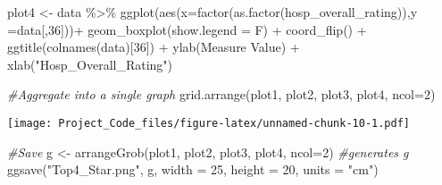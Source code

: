\documentclass[
]{article}
\newenvironment{Shaded}{\begin{snugshade}}{\end{snugshade}}
\newcommand{\AttributeTok}[1]{\textcolor[rgb]{0.77,0.63,0.00}{#1}}
\newcommand{\CommentTok}[1]{\textcolor[rgb]{0.56,0.35,0.01}{\textit{#1}}}
\newcommand{\DecValTok}[1]{\textcolor[rgb]{0.00,0.00,0.81}{#1}}
\newcommand{\FunctionTok}[1]{\textcolor[rgb]{0.00,0.00,0.00}{#1}}
\newcommand{\NormalTok}[1]{#1}
\newcommand{\OtherTok}[1]{\textcolor[rgb]{0.56,0.35,0.01}{#1}}
\newcommand{\SpecialCharTok}[1]{\textcolor[rgb]{0.00,0.00,0.00}{#1}}
\newcommand{\StringTok}[1]{\textcolor[rgb]{0.31,0.60,0.02}{#1}}
\begin{document}
\begin{Shaded}
\begin{Highlighting}[]
\NormalTok{plot4 }\OtherTok{\textless{}{-}}\NormalTok{ data }\SpecialCharTok{\%\textgreater{}\%} \FunctionTok{ggplot}\NormalTok{(}\FunctionTok{aes}\NormalTok{(}\AttributeTok{x=}\FunctionTok{factor}\NormalTok{(}\FunctionTok{as.factor}\NormalTok{(hosp\_overall\_rating)),}\AttributeTok{y =}\NormalTok{data[,}\DecValTok{36}\NormalTok{]))}\SpecialCharTok{+}
  \FunctionTok{geom\_boxplot}\NormalTok{(}\AttributeTok{show.legend =}\NormalTok{ F) }\SpecialCharTok{+}
  \FunctionTok{coord\_flip}\NormalTok{() }\SpecialCharTok{+}
  \FunctionTok{ggtitle}\NormalTok{(}\FunctionTok{colnames}\NormalTok{(data)[}\DecValTok{36}\NormalTok{]) }\SpecialCharTok{+} 
  \FunctionTok{ylab}\NormalTok{(}\StringTok{\textquotesingle{}Measure Value\textquotesingle{}}\NormalTok{) }\SpecialCharTok{+} \FunctionTok{xlab}\NormalTok{(}\StringTok{"Hosp\_Overall\_Rating"}\NormalTok{)}

\CommentTok{\#Aggregate into a single graph}
\FunctionTok{grid.arrange}\NormalTok{(plot1, plot2, plot3, plot4, }\AttributeTok{ncol=}\DecValTok{2}\NormalTok{)}
\end{Highlighting}
\end{Shaded}

\texttt{[image: Project\_Code\_files/figure-latex/unnamed-chunk-10-1.pdf]}

\begin{Shaded}
\begin{Highlighting}[]
\CommentTok{\#Save}
\NormalTok{g }\OtherTok{\textless{}{-}} \FunctionTok{arrangeGrob}\NormalTok{(plot1, plot2, plot3, plot4, }\AttributeTok{ncol=}\DecValTok{2}\NormalTok{) }\CommentTok{\#generates g}
\FunctionTok{ggsave}\NormalTok{(}\StringTok{"Top4\_Star.png"}\NormalTok{, g, }\AttributeTok{width =} \DecValTok{25}\NormalTok{, }\AttributeTok{height =} \DecValTok{20}\NormalTok{, }\AttributeTok{units =} \StringTok{"cm"}\NormalTok{)}
\end{Highlighting}
\end{Shaded}
\end{document}
